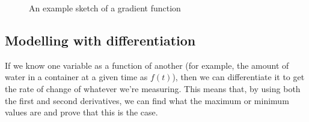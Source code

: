 \begin{figure}[ht]
    \centering
    \caption{An example sketch of a gradient function}
    \label{fig:an-example-sketch-of-a-gradient-function}
\end{figure}

\subsection{Modelling with differentiation}
If we know one variable as a function of another (for example, the amount of water in a container at a given time as $f(t)$), then we can differentiate it to get the rate of change of whatever we're measuring. This means that, by using both the first and second derivatives, we can find what the maximum or minimum values are and prove that this is the case.
